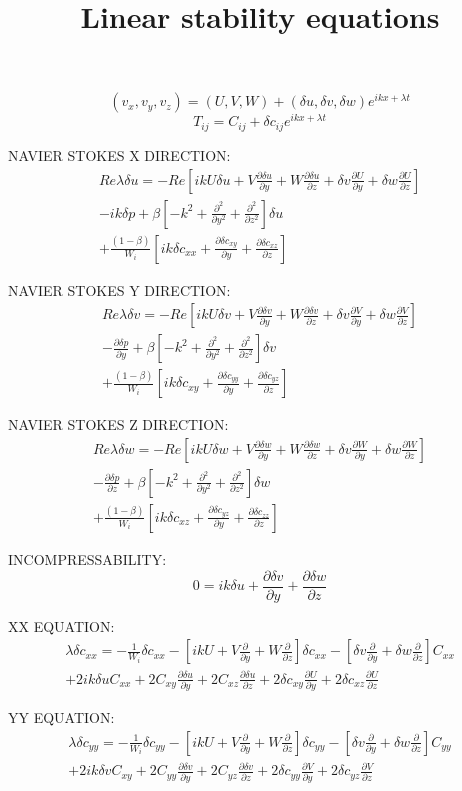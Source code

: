 \documentclass[12,a4paper]{article}
\newcommand{\dy}[1]{\frac{\partial #1}{\partial y}}
\newcommand{\dz}[1]{\frac{\partial #1}{\partial z}}
\newcommand{\scxx}{\delta c_{xx}}
\newcommand{\scyy}{\delta c_{yy}}
\newcommand{\sczz}{\delta c_{zz}}
\newcommand{\scxy}{\delta c_{xy}}
\newcommand{\scxz}{\delta c_{xz}}
\newcommand{\scyz}{\delta c_{yz}}
\newcommand{\su}{\delta u}
\newcommand{\sv}{\delta v}
\newcommand{\sw}{\delta w}
\newcommand{\spr}{\delta p}
\newcommand{\Wi}{\frac{1}{W_{i}}}
\newcommand{\first}[2]{-\Wi \delta c_{#1 #2} - \left[ ikU
+ V\frac{\partial}{\partial y} + W\frac{\partial}{\partial z} \right] \delta c_{#1 #2} 
- \left[ \sv\frac{\partial }{\partial y} + \sw\frac{\partial }{\partial z} \right] C_{#1 #2}}
\newcommand{\laplacian}{\left[-k^{2} + \frac{\partial^{2}}{\partial y^{2}} + \frac{\partial^{2}}{\partial z^{2}}\right]}
\begin{document}
\title{Linear stability equations}
\maketitle

\begin{equation}
 (v_{x}, v_{y}, v_{z}) = (U,V,W) + (\su, \sv, \sw)e^{ikx + \lambda t}
\end{equation}
\begin{equation}
T_{ij} = C_{ij} + \delta c_{ij} e^{ikx + \lambda t}
\end{equation}

NAVIER STOKES X DIRECTION:
\begin{multline}
 Re \lambda \su = -Re \left[ ikU \su + V \dy{\su} + W\dz{\su} + \sv \dy{U} +\sw \dz{U} \right]\\
 - ik\spr + \beta \laplacian \su \\
 + \frac{(1-\beta)}{W_{i}}\left[ ik\scxx + \dy{\scxy} + \dz{\scxz} \right]  
\end{multline}

NAVIER STOKES Y DIRECTION:
\begin{multline}
Re \lambda \sv = -Re \left[ ikU \sv + V \dy{\sv} + W\dz{\sv} + \sv \dy{V} +\sw \dz{V} \right]\\
 - \dy{\spr} + \beta \laplacian \sv \\
 + \frac{(1-\beta)}{W_{i}}\left[ ik \scxy + \dy{\scyy} + \dz{\scyz} \right]
\end{multline}

NAVIER STOKES Z DIRECTION:
\begin{multline}
 Re \lambda \sw = -Re \left[ ikU \sw + V \dy{\sw} + W\dz{\sw} + \sv \dy{W} +\sw \dz{W} \right]\\
 - \dz{\spr} + \beta \laplacian \sw \\
 + \frac{(1-\beta)}{W_{i}}\left[ ik \scxz + \dy{\scyz} + \dz{\sczz} \right]
\end{multline}

INCOMPRESSABILITY:
\begin{equation}
 0 = ik\su + \dy{\sv} + \dz{\sw}
\end{equation}

XX EQUATION:
\begin{multline}
  \lambda \delta c_{xx}  = \first{x}{x} \\
+ 2ik\su C_{xx} + 2C_{xy} \dy{\su} + 2C_{xz} \dz{\su} + 2\scxy \dy{U} + 2\scxz \dz{U}
\end{multline}

YY EQUATION:
\begin{multline}
 \lambda \delta c_{yy} = \first{y}{y} \\
+ 2ik\sv C_{xy} + 2C_{yy}\dy{\sv} + 2C_{yz}\dz{\sv} + 2\scyy \dy{V} + 2\scyz \dz{V}\\
\end{multline}
\end{document}

